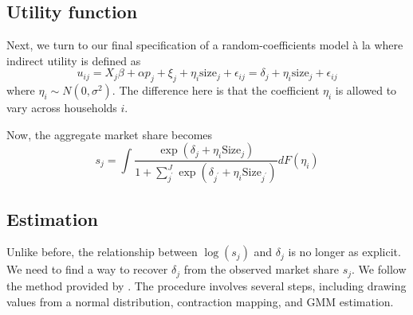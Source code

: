 \documentclass[12pt]{article}[margin=1in]
\begin{document}
\subsection{Utility function}
Next, we turn to our final specification of a random-coefficients model \`a la
\citet{berrylevinsohnpakes1995} where indirect utility is defined as
\begin{equation}
    u_{ij}=X_{j}\beta + \alpha p_{j} + \xi_{j} + \eta_i\text{size}_j + \epsilon_{ij} = \delta_j + \eta_i\text{size}_j + \epsilon_{ij}
\end{equation}
where $\eta_i \sim N(0,\sigma^2)$.
The difference here is that the coefficient $\eta_i$ is allowed to vary across
households $i$.

Now, the aggregate market share becomes
\[
    s_j = \int \frac{\exp{(\delta_j + \eta_i \text{Size}_j)}}{1 + \sum_{j^{\prime}}^{J} \exp{(\delta_{j^{\prime}} + \eta_i \text{Size}_{j^{\prime}})}} dF(\eta_i)
\]

\subsection{Estimation}
Unlike before, the relationship between $\log(s_j)$ and $\delta_j$ is no longer
as explicit. We need to find a way to recover $\delta_j$ from the observed
market share $s_j$. We follow the method provided by
\citet{berrylevinsohnpakes1995}. The procedure involves several steps,
including drawing values from a normal distribution, contraction mapping, and
GMM estimation.
\end{document}
